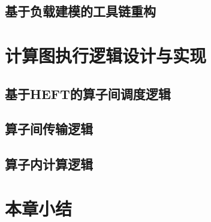   \subsection{基于负载建模的工具链重构}\label{subsubsec:toolchain_refractor}
    
\section{计算图执行逻辑设计与实现}\label{subsec:task_split_strategy_impl}
    \subsection{基于HEFT的算子间调度逻辑}\label{subsec:HEFT_based_scheduling_logic_impl}
    \subsection{算子间传输逻辑}\label{subsec:inter_op_logic_impl}
    \subsection{算子内计算逻辑}\label{subsec:intra_op_logic_impl}
\section{本章小结}\label{sec:chap3_summary}